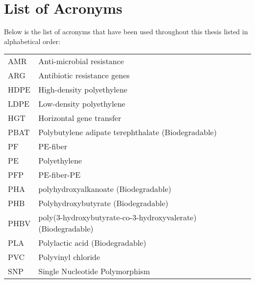 \thispagestyle{plain}			%
\chapter*{List of Acronyms}
Below is the list of acronyms that have been used throughout this thesis listed in alphabetical order:
\vspace*{1.0cm}

\begin{tabular}{p{3cm}p{12cm}}
AMR & Anti-microbial resistance \\
ARG & Antibiotic resistance genes \\
HDPE & High-density polyethylene \\
LDPE & Low-density polyethylene \\
HGT & Horizontal gene transfer \\
PBAT & Polybutylene adipate terephthalate (Biodegradable) \\
PF & PE-fiber \\
PE & Polyethylene \\
PFP & PE-fiber-PE \\
PHA & polyhydroxyalkanoate (Biodegradable) \\
PHB & Polyhydroxybutyrate (Biodegradable) \\
PHBV & poly(3-hydroxybutyrate-co-3-hydroxyvalerate) (Biodegradable) \\
PLA & Polylactic acid (Biodegradable) \\
PVC & Polyvinyl chloride \\ 
SNP & Single Nucleotide Polymorphism
\end{tabular}





\newpage				%
\thispagestyle{empty}
\mbox{}

